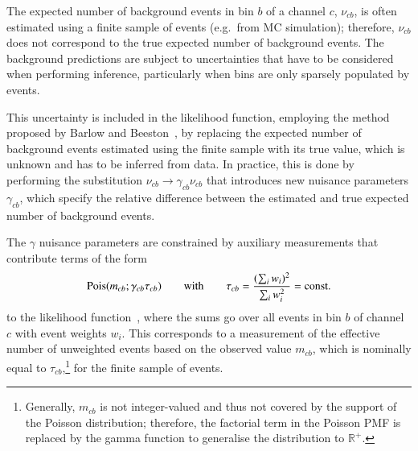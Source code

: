 The expected number of background events in bin $b$ of a channel $c$,
$\nu_{cb}$, is often estimated using a finite sample of events (e.g.\ from MC
simulation); therefore, $\nu_{cb}$ does not correspond to the true expected
number of background events. The background predictions are subject to
uncertainties that have to be considered when performing inference, particularly
when bins are only sparsely populated by events.

This uncertainty is included in the likelihood function, employing the method
proposed by Barlow and Beeston~\cite{barlow1993}, by replacing the expected
number of background events estimated using the finite sample with its true
value, which is unknown and has to be inferred from data. In practice, this is
done by performing the substitution $\nu_{cb} \rightarrow \gamma_{cb} \nu_{cb}$
that introduces new nuisance parameters $\gamma_{cb}$, which specify the
relative difference between the estimated and true expected number of background
events.

The $\gamma$ nuisance parameters are constrained by auxiliary measurements that
contribute terms of the form
\begin{align*}
  \operatorname{Pois}(m_{cb} ; \gamma_{cb} \tau_{cb})
  \qquad \text{with} \qquad
  \tau_{cb} = \frac{( \sum_i w_i )^2}{\sum_i w_i^2} = \text{const.}
\end{align*}
to the likelihood function~\cite{cranmer2012}, where the sums go over all events
in bin $b$ of channel $c$ with event weights $w_i$. This corresponds to a
measurement of the effective number of unweighted events based on the observed
value $m_{cb}$, which is nominally equal to $\tau_{cb}$,\footnote{Generally,
  $m_{cb}$ is not integer-valued and thus not covered by the support of the
  Poisson distribution; therefore, the factorial term in the Poisson PMF is
  replaced by the gamma function to generalise the distribution to
  $\mathbb{R}^+$.} for the finite sample of events.

